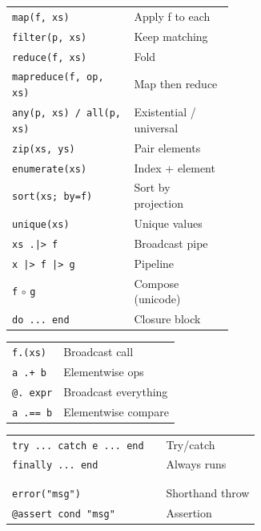 \documentclass[10pt]{extarticle}
\begin{document}
\begin{multicols}{2}
\begin{tabularx}{\linewidth}{@{}>{\raggedright\arraybackslash}p{0.55\linewidth}@{\enspace}Y@{}}
\texttt{map(f, xs)}                 & Apply f to each \\
\texttt{filter(p, xs)}             & Keep matching \\
\texttt{reduce(f, xs)}             & Fold \\
\texttt{mapreduce(f, op, xs)}      & Map then reduce \\
\texttt{any(p, xs) / all(p, xs)}   & Existential / universal \\
\texttt{zip(xs, ys)}               & Pair elements \\
\texttt{enumerate(xs)}             & Index + element \\
\texttt{sort(xs; by=f)}            & Sort by projection \\
\texttt{unique(xs)}                & Unique values \\
\texttt{xs .|> f}                  & Broadcast pipe \\
\texttt{x |> f |> g}              & Pipeline \\
\texttt{f} $\circ$ \texttt{g}      & Compose (unicode) \\
\texttt{do ... end}                & Closure block \\
\end{tabularx}

\begin{tabularx}{\linewidth}{@{}l@{\enspace}Y@{}}
\texttt{f.(xs)}                     & Broadcast call \\
\texttt{a .+ b}                    & Elementwise ops \\
\texttt{@. expr}                   & Broadcast everything \\
\texttt{a .== b}                   & Elementwise compare \\
\end{tabularx}

\begin{tabularx}{\linewidth}{@{}>{\raggedright\arraybackslash}p{0.62\linewidth}@{\enspace}Y@{}}
\texttt{try ... catch e ... end}   & Try/catch \\
\texttt{finally ... end}           & Always runs \\
 & \\
 \\
\texttt{error("msg")}             & Shorthand throw \\
\texttt{@assert cond "msg"}       & Assertion \\
\end{tabularx}


\end{multicols}
\end{document}
